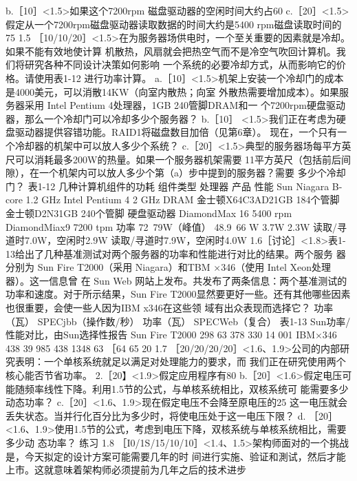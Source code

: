 b.［10］<1.5>如果这个7200rpm 磁盘驱动器的空闲时间大约占60%
c.［20］<1.5>假定从一个7200rpm磁盘驱动器读取数据的时间大约是5400 rpm磁盘读取时间的
75%
1.5
［10/10/20］<1.5>在为服务器场供电时，一个至关重要的因素就是冷却。如果不能有效地使计算
机散热，风扇就会把热空气而不是冷空气吹回计算机。我们将研究各种不同设计决策如何影响
一个系统的必要冷却方式，从而影响它的价格。请使用表1-12 进行功率计算。
a.［10］<1.5>机架上安装一个冷却门的成本是4000美元，可以消散14KW（向室内散热；向室
外散热需要增加成本）。如果服务器采用 Intel Pentium 4处理器，1GB 240管脚DRAM和一
个7200rpm硬盘驱动器，那么一个冷却门可以冷却多少个服务器？
b.［10］ <1.5>我们正在考虑为硬盘驱动器提供容错功能。RAID1将磁盘数目加倍（见第6章）。
现在，一个只有一个冷却器的机架中可以放人多少个系统？
c.［20］<1.5>典型的服务器场每平方英尺可以消耗最多200W的热量。如果一个服务器机架需要
11平方英尺（包括前后间隙），在一个机架内可以放人多少个第（a）步中提到的服务器？需要
多少个冷却门？
表1-12 几种计算机组件的功耗
组件类型
处理器
产品
性能
Sun Niagara B-core
1.2 GHz
Intel Pentium 4
2 GHz
DRAM
金士顿X64C3AD21GB
184个管脚
金士顿D2N31GB
240个管脚
硬盘驱动器
DiamondMax 16
5400 rpm
DiamondMiax9
7200 tpm
功率
72~79W（峰值）
48.9~66 W
3.7W
2.3W
读取/寻道时7.0W，空闲时2.9W
读取/寻道时7.9W，空闲时4.0W
1.6［讨论］<1.8>表1-13给出了几种基准测试对两个服务器的功率和性能进行对比的结果。两个服务
器分别为 Sun Fire T2000（采用 Niagara）和TBM ×346（使用 Intel Xeon处理器）。这一信息曾
在 Sun Web 网站上发布。共发布了两条信息：两个基准测试的功率和速度。对于所示结果，Sun
Fire T2000显然要更好一些。还有其他哪些因素也很重要，会使一些人因为IBM x346在这些领
域有出众表现而选择它？
功率（瓦）
SPECjbb（操作数/秒）
功率（瓦）
SPECWeb（复合）
表1-13 Sun功率/性能对比，由Sun选择性报告
Sun Fire T2000
298
63 378
330
14 001
IBM×346
438
39 985
438
1348
63
［64
65
20
1.7
［20/20/20/20］<1.6、1.9>公司的内部研究表明：一个单核系统就足以满足对处理能力的要求，而
我们正在研究使用两个核心能否节省功率。
2.［20】<1.9>假定应用程序有80%
b.［20］<1.6>假定电压可能随频率线性下降。利用1.5节的公式，与单核系统相比，双核系统可
能需要多少动态功率？
c.［20］<1.6、1.9>现在假定电压不会降至原电压的25%
这一电压就会丢失状态。当并行化百分比为多少时，将使电压处于这一电压下限？
d. ［20］<1.6、1.9>使用1.5节的公式，考虑到电压下降，双核系统与单核系统相比，需要多少动
态功率？
练习
1.8
［I0/1S/15/10/10］<1.4、1.5>架构师面对的一个挑战是，今天拟定的设计方案可能需要几年的时
间进行实施、验证和測试，然后才能上市。这就意味着架构师必须提前为几年之后的技术进步
